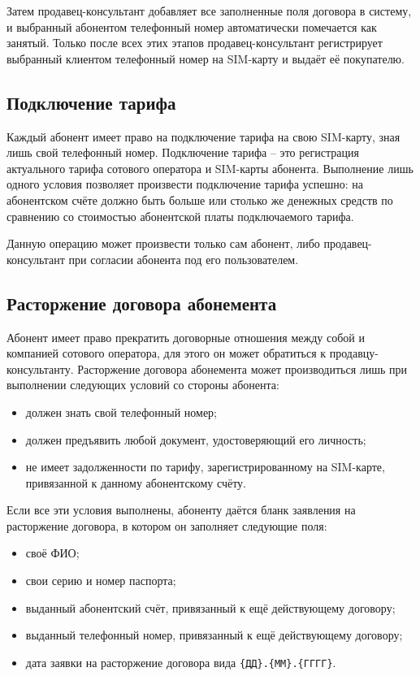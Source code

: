 Затем продавец-консультант добавляет все заполненные поля договора в систему, и выбранный абонентом телефонный номер автоматически помечается как занятый. Только после всех этих этапов продавец-консультант регистрирует выбранный клиентом телефонный номер на SIM-карту и выдаёт её покупателю.


\subsection{Подключение тарифа}


Каждый абонент имеет право на подключение тарифа на свою SIM-карту, зная лишь свой телефонный номер. Подключение тарифа -- это регистрация актуального тарифа сотового оператора и SIM-карты абонента. Выполнение лишь одного условия позволяет произвести подключение тарифа успешно: на абонентском счёте должно быть больше или столько же денежных средств по сравнению со стоимостью абонентской платы подключаемого тарифа.

Данную операцию может произвести только сам абонент, либо продавец-консультант при согласии абонента под его пользователем.


\subsection{Расторжение договора абонемента}


Абонент имеет право прекратить договорные отношения между собой и компанией сотового оператора, для этого он может обратиться к продавцу-консультанту. Расторжение договора абонемента может производиться лишь при выполнении следующих условий со стороны абонента:
\begin{itemize}
    \item должен знать свой телефонный номер;
    \item должен предъявить любой документ, удостоверяющий его личность;
    \item не имеет задолженности по тарифу, зарегистрированному на SIM-карте, привязанной к данному абонентскому счёту.
\end{itemize} 

Если все эти условия выполнены, абоненту даётся бланк заявления на расторжение договора, в котором он заполняет следующие поля:
\begin{itemize}
    \item своё ФИО;
    \item свои серию и номер паспорта;
    \item выданный абонентский счёт, привязанный к ещё действующему договору;
    \item выданный телефонный номер, привязанный к ещё действующему договору;
    \item дата заявки на расторжение договора вида \texttt{\{ДД\}.\{ММ\}.\{ГГГГ\}}.
\end{itemize}

